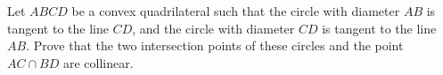 Let $ABCD$ be a convex quadrilateral such that the circle with diameter $AB$ is tangent to the line $CD$,
and the circle with diameter $CD$ is tangent to the line $AB$.
Prove that the two intersection points of these circles and the point $AC\cap BD$ are collinear.
